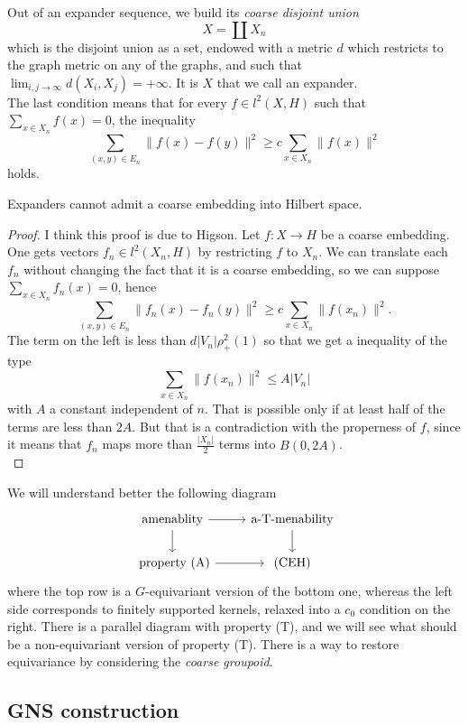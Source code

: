 Out of an expander sequence, we build its \textit{coarse disjoint union}
\[X = \coprod X_n\]
which is the disjoint union as a set, endowed with a metric $d$ which restricts to the graph metric on any of the graphs, and such that $\lim_{i,j\rightarrow \infty} d(X_i,X_j)=+\infty$. It is $X$ that we call an expander.\\

The last condition means that for every $f\in l^2(X,H)$ such that $\sum_{x\in X_n} f(x)=0$, the inequality
\[\sum_{(x,y)\in E_n} \| f(x)-f(y) \|^2 \geq c \sum_{x\in X_n} \| f(x)\|^2    \]
holds.

\begin{thm}
Expanders cannot admit a coarse embedding into Hilbert space.
\end{thm}

\begin{proof} 
I think this proof is due to Higson. Let $f: X \rightarrow H$ be a coarse embedding. One gets vectors $f_n\in l^2(X_n,H)$ by restricting $f$ to $X_n$. We can translate each $f_n$ without changing the fact that it is a coarse embedding, so we can suppose $\sum_{x\in X_n} f_n(x)=0$, hence
\[\sum_{(x,y)\in E_n} \| f_n(x)-f_n(y) \|^2 \geq c \sum_{x\in X_n} \| f(x_n)\|^2.\]
The term on the left is less than $d |V_n| \rho_+^2(1)$ so that we get a inequality of the type
\[\sum_{x\in X_n} \| f(x_n)\|^2 \leq A |V_n|\]
with $A$ a constant independent of $n$. That is possible only if at least half of the terms are less than $2A$. But that is a contradiction with the properness of $f$, since it means that $f_n$ maps more than $\frac{|X_n|}{2}$ terms into $B(0,2A)$.\\	 
\end{proof}

We will understand better the following diagram
\[\begin{tikzcd}
\text{amenablity} \arrow{r}\arrow{d} & \text{a-T-menability} \arrow{d} \\
\text{ property (A)} \arrow{r} & \text{ (CEH) }  
\end{tikzcd}\]
where the top row is a $G$-equivariant version of the bottom one, whereas the left side corresponds to finitely supported kernels, relaxed into a $c_0$ condition on the right. There is a parallel diagram with property (T), and we will see what should be a non-equivariant version of property (T). There is a way to restore equivariance by considering the \textit{coarse groupoid}.

\subsection{GNS construction}

